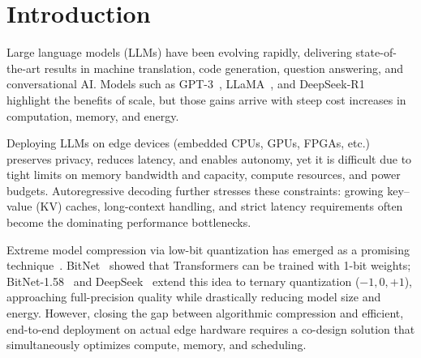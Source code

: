 \documentclass[sigconf]{acmart}
\begin{document}
\begin{abstract}
\end{abstract}



\maketitle

\section{Introduction}
Large language models (LLMs) have been evolving rapidly, delivering state-of-the-art results in machine translation, code generation, question answering, and conversational AI. Models such as GPT-3~\cite{brown2020language}, LLaMA~\cite{touvron2023LLaMA}, and DeepSeek-R1~\cite{guo2025deepseek} highlight the benefits of scale, but those gains arrive with steep cost increases in computation, memory, and energy.

Deploying LLMs on edge devices (embedded CPUs, GPUs, FPGAs, etc.) preserves privacy, reduces latency, and enables autonomy, yet it is difficult due to tight limits on memory bandwidth and capacity, compute resources, and power budgets. Autoregressive decoding further stresses these constraints: growing key–value (KV) caches, long-context handling, and strict latency requirements often become the dominating performance bottlenecks. %

Extreme model compression via low-bit quantization has emerged as a promising technique~\cite{qiao2022two,10025006}. BitNet~\cite{bitnet,qiao2025cobra, qiao2025tellme} showed that Transformers can be trained with 1-bit weights; BitNet-1.58~\cite{bitnet158} and DeepSeek~\cite{deepseek} extend this idea to ternary quantization (${-1,0,+1}$), approaching full-precision quality while drastically reducing model size and energy. However, closing the gap between algorithmic compression and efficient, end-to-end deployment on actual edge hardware requires a co-design solution that simultaneously optimizes compute, memory, and scheduling.
\end{document}
